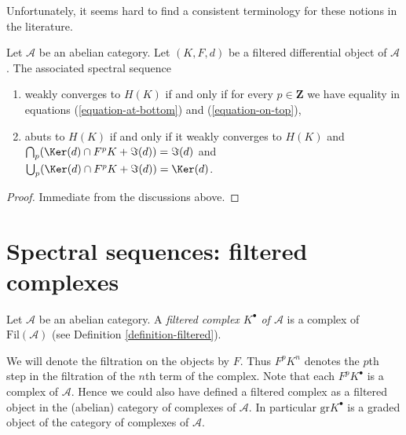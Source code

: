 \noindent
Unfortunately, it seems hard to find a consistent terminology for these
notions in the literature.

\begin{lemma}
\label{lemma-filtered-differential-ss-converges}
Let $\mathcal{A}$ be an abelian category.
Let $(K, F, d)$ be a filtered differential object of $\mathcal{A}$.
The associated spectral sequence
\begin{enumerate}
\item weakly converges to $H(K)$ if and only if for every
$p \in \mathbf{Z}$ we have equality in equations
(\ref{equation-at-bottom}) and (\ref{equation-on-top}),
\item abuts to $H(K)$ if and only if it weakly converges to $H(K)$ and
$\bigcap_p (\Ker(d) \cap F^pK + \Im(d)) = \Im(d)$
and $\bigcup_p (\Ker(d) \cap F^pK + \Im(d)) = \Ker(d)$.
\end{enumerate}
\end{lemma}

\begin{proof}
Immediate from the discussions above.
\end{proof}














\section{Spectral sequences: filtered complexes}
\label{section-filtered-complex}

\begin{definition}
\label{definition-filtered-complex}
Let $\mathcal{A}$ be an abelian category.
A {\it filtered complex $K^\bullet$ of $\mathcal{A}$}
is a complex of $\text{Fil}(\mathcal{A})$ (see
Definition \ref{definition-filtered}).
\end{definition}

\noindent
We will denote the filtration on the objects by $F$. Thus
$F^pK^n$ denotes the $p$th step in the filtration of the $n$th term of the
complex. Note that each $F^pK^\bullet$ is a complex of $\mathcal{A}$.
Hence we could also have defined a filtered complex as a filtered object
in the (abelian) category of complexes of $\mathcal{A}$.
In particular $\text{gr} K^\bullet$ is a graded object of the
category of complexes of $\mathcal{A}$.

